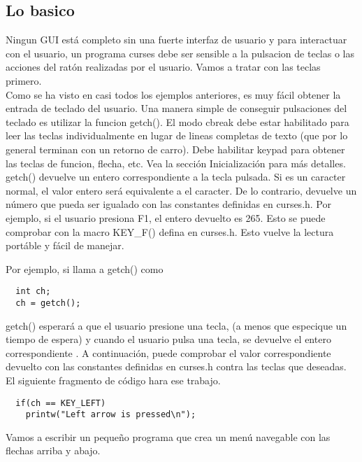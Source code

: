 \documentclass{article}
\begin{document}
\subsection{Lo basico}%
Ningun GUI está completo sin una fuerte interfaz de usuario y para interactuar
con el usuario, un programa curses debe ser sensible a la pulsacion de teclas o
las acciones del ratón realizadas por el usuario. Vamos a tratar con las teclas
primero.\\

Como se ha visto en casi todos los ejemplos anteriores, es muy fácil obtener la
entrada de teclado del usuario. Una manera simple de conseguir pulsaciones del
teclado es utilizar la funcion getch(). El modo cbreak debe estar habilitado
para leer las teclas individualmente en lugar de lineas completas de texto (que
por lo general terminan con un retorno de carro). Debe habilitar keypad para
obtener las teclas de funcion, flecha, etc. Vea la sección Inicialización para
más detalles.\\

getch() devuelve un entero correspondiente a la tecla pulsada. Si es un
caracter normal, el valor entero será equivalente a el caracter. De lo
contrario, devuelve un número que pueda ser igualado con las constantes
definidas en curses.h. Por ejemplo, si el usuario presiona F1, el entero
devuelto es 265. Esto se puede comprobar con la macro KEY\_F() defina en
curses.h. Esto vuelve la lectura portáble y fácil de manejar.

Por ejemplo, si llama a getch() como

\begin{verbatim}
  int ch;
  ch = getch();
\end{verbatim}

getch() esperará a que el usuario presione una tecla, (a menos que especique un
tiempo de espera) y cuando el usuario pulsa una tecla, se devuelve el entero
correspondiente . A continuación, puede comprobar el valor correspondiente
devuelto con las constantes definidas en curses.h contra las teclas que
deseadas.\\

El siguiente fragmento de código hara ese trabajo.

\begin{verbatim}
  if(ch == KEY_LEFT)
    printw("Left arrow is pressed\n");
\end{verbatim}

Vamos a escribir un pequeño programa que crea un menú navegable con las flechas
arriba y abajo.
\end{document}
